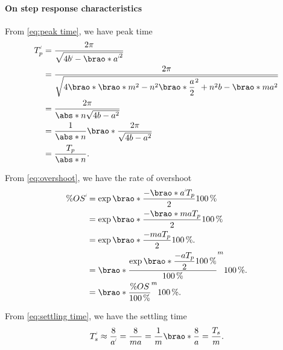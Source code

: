\documentclass[12pt]{article}
\DeclarePairedDelimiter\brao()%
\DeclarePairedDelimiter\abs||
\newcommand{\setprime}[2][1]{%
    {#2}^{%
        \raisebox{1pt}{%
            \scalebox{0.5}{%
                \itshape\sffamily\uppercase%
                \expandafter{%
                    \romannumeral#1%
                }%
            }%
        }
    }%
}%
\begin{document}
\begin{enumerate}[(a)]
        \paragraph{On step response characteristics}
        From \eqref{eq:peak time}, we have peak time
        \begin{equation}\label{eq:peak time, m, n}
            \begin{aligned}
                \setprime{T}_p &{}= \frac{2\pi}{\sqrt{4\setprime{b} - \brao*{\setprime{a}}^2}}
            \\*
                    &{}= \frac{2\pi}{\sqrt{4\brao*{\brao*{m^2 - n^2}\brao*{\dfrac{a}2}^2 + n^2 b} - \brao*{ma}^2}}
            \\*
                    &{}= \frac{2\pi}{\abs*n\sqrt{4b - a^2}}
            \\*
                    &{}= \frac1{\abs*n} \brao*{\frac{2\pi}{\sqrt{4b - a^2}}}
            \\*
                    &{}= \frac{T_p}{\abs*n}.
            \\*
            \end{aligned}
        \end{equation}

        From \eqref{eq:overshoot}, we have the rate of overshoot
        \begin{equation}\label{eq:overshoot, m, n}
            \begin{aligned}
                \%\setprime{OS} &{}= \exp\brao*{\dfrac{-\brao*{\setprime{a}}T_p}{2}} \SI{100}\percent
            \\*
                     &{}= \exp\brao*{\dfrac{-\brao*{ma}T_p}{2}} \SI{100}\percent
            \\*
                     &{}= \exp\brao*{\dfrac{-ma T_p}{2}} \SI{100}\percent.
            \\*
                     &{}= \brao*{\frac{\exp\brao*{\dfrac{-a T_p}{2}}\SI{100}\percent}{\SI{100}\percent}}^m \SI{100}\percent.
            \\*
                     &{}= \brao*{\frac{\%OS}{\SI{100}\percent}}^m \SI{100}\percent.
            \\*
            \end{aligned}
        \end{equation}

        From \eqref{eq:settling time}, we have the settling time
        \begin{equation}\label{eq:settling time, m, n}
            \setprime{T}_s \approx \frac8{\setprime{a}} = \frac8{ma} = \frac1m\brao*{\frac8{a}} = \frac{T_s}m.
        \end{equation}


\end{enumerate}
\end{document}

